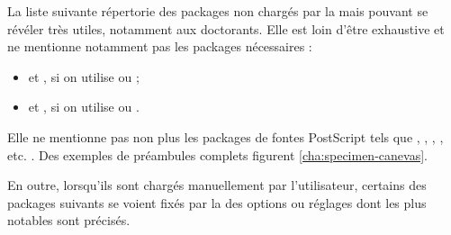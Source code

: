 La liste suivante répertorie des packages non chargés par la \yatcl{} mais
pouvant se révéler très utiles, notamment aux doctorants.  Elle est loin d'être
exhaustive et ne mentionne notamment pas les packages nécessaires :
\begin{itemize}
\item {} et , si on utilise  ou
   ;
\item {} et , si on utilise 
  ou .
\end{itemize}
Elle ne mentionne pas non plus les packages de fontes PostScript tels que
, , , ,
etc. . Des exemples de préambules complets figurent
\vref{cha:specimen-canevas}.

En outre, lorsqu'ils sont chargés manuellement par l'utilisateur, certains des
packages suivants se voient fixés par la \yatcl{} des options ou réglages dont
les plus notables sont précisés.

